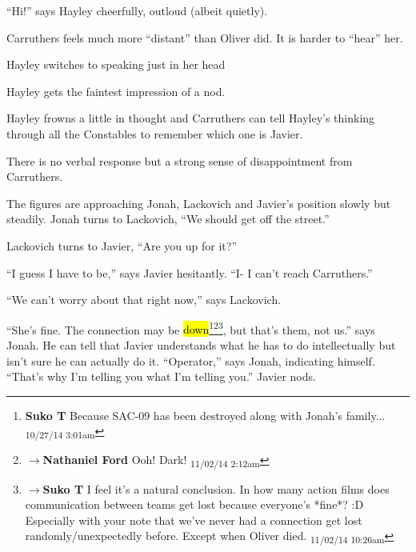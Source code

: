 ``Hi!'' says Hayley cheerfully, outloud (albeit quietly).

 Carruthers feels much more ``distant'' than Oliver did.  It is harder to ``hear'' her.

Hayley switches to speaking just in her head   

Hayley gets the faintest impression of a nod.   

Hayley frowns a little in thought and Carruthers can tell Hayley's thinking through all the Constables to remember which one is Javier.    

There is no verbal response but a strong sense of disappointment from Carruthers.



The figures are approaching Jonah, Lackovich and Javier's position slowly but steadily.  Jonah turns to Lackovich, ``We should get off the street.''

Lackovich turns to Javier, ``Are you up for it?''

``I guess I have to be,'' says Javier hesitantly. ``I- I can't reach Carruthers.''

``We can't worry about that right now,'' says Lackovich.

``She's fine.  The connection may be \hl{down}\footnote{\textbf{Suko T }Because SAC-09 has been destroyed along with Jonah's family... \textsubscript{10/27/14 3:01am}}\footnote{$\rightarrow$\textbf{Nathaniel Ford }Ooh! Dark! \textsubscript{11/02/14 2:12am}}\footnote{$\rightarrow$\textbf{Suko T }I feel it's a natural conclusion.  In how many action films does communication between teams get lost because everyone's *fine*? :D  Especially with your note that we've never had a connection get lost randomly/unexpectedly before.  Except when Oliver died. \textsubscript{11/02/14 10:26am}}, but that's them, not us.'' says Jonah.  He can tell that Javier understands what he has to do intellectually but isn't sure he can actually do it.  ``Operator,'' says Jonah, indicating himself. ``That's why I'm telling you what I'm telling you.''  Javier nods.



